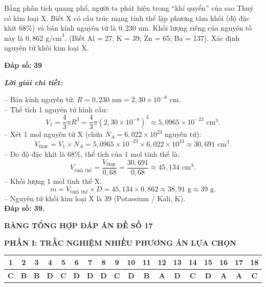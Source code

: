 \documentclass[11pt,a4paper]{article}
\def\loigiai#1{
\par\begingroup\color{blue!80!black}\small
\noindent\textbf{\textit{Lời giải chi tiết:}}\par
#1\par\endgroup}
\begin{document}
\begin{ex}
Bằng phân tích quang phổ, người ta phát hiện trong “khí quyển” của sao Thuỷ có kim loại X. Biết X có cấu trúc mạng tinh thể lập phương tâm khối (độ đặc khít 68\%) và bán kính nguyên tử là $0{,}230\text{ nm}$. Khối lượng riêng của nguyên tố này là $0{,}862\text{ g/cm}^3$. (Biết Al = 27; K = 39; Zn = 65; Ba = 137). Xác định nguyên tử khối kim loại X.
\par\noindent\textbf{Đáp số:} \textbf{\color{red}39}
\loigiai{
-- Bán kính nguyên tử: $R = 0{,}230\text{ nm} = 2{,}30 \times 10^{-8}\text{ cm}$.\\
-- Thể tích 1 nguyên tử hình cầu:
$$V_1 = \frac{4}{3} \pi R^3 = \frac{4}{3} \pi (2{,}30 \times 10^{-8})^3 \approx 5{,}0965 \times 10^{-23}\text{ cm}^3.$$
-- Xét 1 mol nguyên tử X (chứa $N_A = 6{,}022 \times 10^{23}$ nguyên tử):
$$V_{\text{thực}} = V_1 \times N_A = 5{,}0965 \times 10^{-23} \times 6{,}022 \times 10^{23} \approx 30{,}691\text{ cm}^3.$$
-- Do độ đặc khít là 68\%, thể tích của 1 mol tinh thể là:
$$V_{\text{tinh thể}} = \frac{V_{\text{thực}}}{0{,}68} = \frac{30{,}691}{0{,}68} \approx 45{,}134\text{ cm}^3.$$
-- Khối lượng 1 mol tinh thể X:
$$m = V_{\text{tinh thể}} \times D = 45{,}134 \times 0{,}862 \approx 38{,}91\text{ g} \approx 39\text{ g.}$$
-- Nguyên tử khối kim loại X là 39 (Potassium / Kali, K).\\
\textbf{Đáp số: 39.}}
\end{ex}



\vspace{0.5cm}
\begin{center}
	\textbf{\Large\color{mainGreen}BẢNG TỔNG HỢP ĐÁP ÁN ĐỀ SỐ 17}
\end{center}

\vspace{0.2cm}
\noindent\textbf{\color{mainGreen}PHẦN I: TRẮC NGHIỆM NHIỀU PHƯƠNG ÁN LỰA CHỌN}
\begin{center}
\renewcommand{\arraystretch}{1.2}
\begin{tabular}{|c|c|c|c|c|c|c|c|c|c|c|c|c|c|c|c|c|c|}
\hline
\textbf{1} & \textbf{2} & \textbf{3} & \textbf{4} & \textbf{5} & \textbf{6} & \textbf{7} & \textbf{8} & \textbf{9} & \textbf{10} & \textbf{11} & \textbf{12} & \textbf{13} & \textbf{14} & \textbf{15} & \textbf{16} & \textbf{17} & \textbf{18} \\ \hline
\textbf{\color{red}C} & \textbf{\color{red}B} & \textbf{\color{red}B} & \textbf{\color{red}D} & \textbf{\color{red}C} & \textbf{\color{red}D} & \textbf{\color{red}D} & \textbf{\color{red}D} & \textbf{\color{red}C} & \textbf{\color{red}D} & \textbf{\color{red}B} & \textbf{\color{red}A} & \textbf{\color{red}D} & \textbf{\color{red}C} & \textbf{\color{red}D} & \textbf{\color{red}A} & \textbf{\color{red}A} & \textbf{\color{red}C} \\ \hline
\end{tabular}
\end{center}
\end{document}
